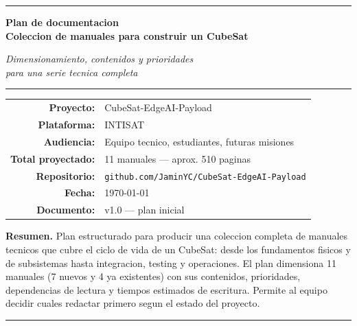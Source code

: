 \documentclass[11pt,a4paper,oneside]{report}
\begin{document}
\begin{titlepage}
\centering
\vspace*{1cm}
{\color{intisat}\rule{\textwidth}{2pt}}
\vspace{0.6cm}

{\Huge\bfseries\color{intisat} Plan de documentacion}\\[0.4em]
{\LARGE\bfseries Coleccion de manuales para construir un CubeSat}

\vspace{0.7cm}
{\Large\itshape Dimensionamiento, contenidos y prioridades\\
para una serie tecnica completa}

\vspace{1cm}
{\color{intisataccent}\rule{0.6\textwidth}{1pt}}

\vspace{2cm}

\begin{tabular}{rl}
\textbf{Proyecto:} & CubeSat-EdgeAI-Payload \\
\textbf{Plataforma:} & INTISAT \\
\textbf{Audiencia:} & Equipo tecnico, estudiantes, futuras misiones \\
\textbf{Total proyectado:} & 11 manuales --- aprox. 510 paginas \\
\textbf{Repositorio:} & \texttt{github.com/JaminYC/CubeSat-EdgeAI-Payload} \\
\textbf{Fecha:} & \today \\
\textbf{Documento:} & v1.0 --- plan inicial
\end{tabular}

\vfill

\begin{minipage}{0.85\textwidth}
\textbf{Resumen.}\quad
Plan estructurado para producir una coleccion completa de manuales
tecnicos que cubre el ciclo de vida de un CubeSat: desde los fundamentos
fisicos y de subsistemas hasta integracion, testing y operaciones. El
plan dimensiona 11 manuales (7 nuevos y 4 ya existentes) con sus
contenidos, prioridades, dependencias de lectura y tiempos estimados de
escritura. Permite al equipo decidir cuales redactar primero segun el
estado del proyecto.
\end{minipage}

\vspace{1.2cm}
{\color{intisat}\rule{\textwidth}{2pt}}
\end{titlepage}

\tableofcontents
\clearpage
\end{document}
